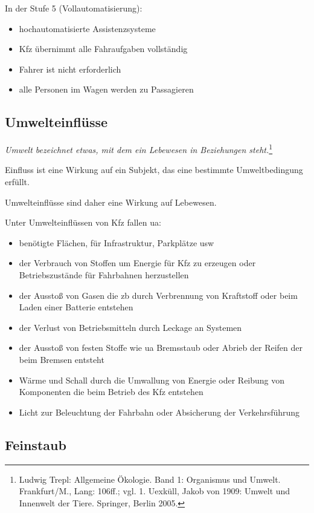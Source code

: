 In der Stufe 5 (Vollautomatisierung):
\begin{itemize}
	\item hochautomatisierte Assistenzsysteme
	\item \ac{Kfz} übernimmt alle Fahraufgaben vollständig
	\item Fahrer ist nicht erforderlich
	\item alle Personen im Wagen werden zu Passagieren
\end{itemize}

\subsection{Umwelteinflüsse}

\textit{Umwelt bezeichnet etwas, mit dem ein Lebewesen in Beziehungen steht.}\footnote{Ludwig Trepl: Allgemeine Ökologie. Band 1: Organismus und Umwelt. Frankfurt/M., Lang: 106ff.; vgl. 1. Uexküll, Jakob von 1909: Umwelt und Innenwelt der Tiere. Springer, Berlin 2005.}

Einfluss ist eine Wirkung auf ein Subjekt, das eine bestimmte Umweltbedingung erfüllt.

Umwelteinflüsse sind daher eine Wirkung auf Lebewesen.

\vspace{.5cm}
Unter Umwelteinflüssen von \ac{Kfz} fallen \ac{ua}:
\begin{itemize}
	\item benötigte Flächen, für Infrastruktur, Parkplätze \ac{usw}
	\item der Verbrauch von Stoffen um Energie für \ac{Kfz} zu erzeugen oder Betriebszustände für Fahrbahnen herzustellen
	\item der Ausstoß von Gasen die \ac{zb} durch Verbrennung von Kraftstoff oder beim Laden einer Batterie entstehen
	\item der Verlust von Betriebsmitteln durch Leckage an Systemen
	\item der Ausstoß von festen Stoffe wie \ac{ua} Bremsstaub oder Abrieb der Reifen der beim Bremsen entsteht
	\item Wärme und Schall durch die Umwallung von Energie oder Reibung von Komponenten die beim Betrieb des \ac{Kfz} entstehen
	\item Licht zur Beleuchtung der Fahrbahn oder Absicherung der Verkehrsführung
\end{itemize}


\subsection{Feinstaub}

